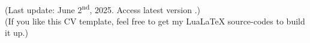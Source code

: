 \documentclass[localFont]{awesome-source-cv} %
\begin{document}
	\makecvheader

	
	
	

	\noindent \\		
	(Last update: June 2\textsuperscript{nd}, 2025. Access latest version .)\\
	(If you like this CV template, feel free to get  \hspace{0.35 mm} my LuaLaTeX source-codes to build it up.)
\end{document}
